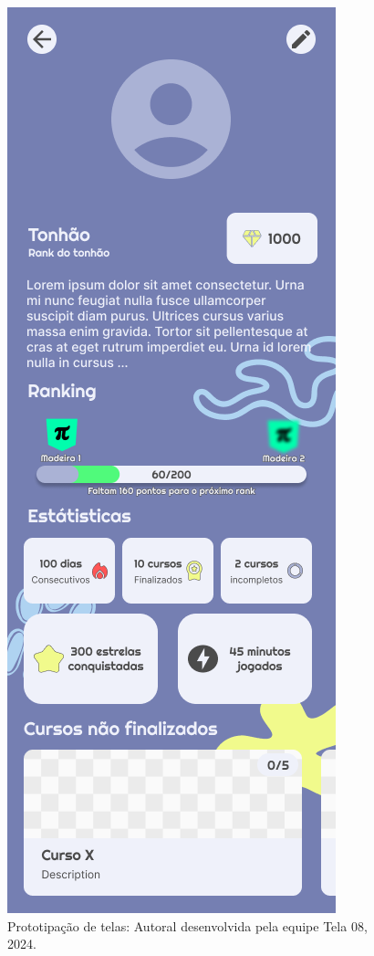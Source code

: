 \documentclass[12pt, openany, oneside, a4paper, english, brazil]{abntex2}   %
\begin{document}
\begin{figure}
    \centering
    \includegraphics[scale=0.7]{figuras/Math.Pow App/Profile V3.png}
    \caption{Prototipação de telas: Autoral desenvolvida pela equipe Tela 08, 2024.}
    \label{fig:nome-da-imagem}
\end{figure}
\end{document}
